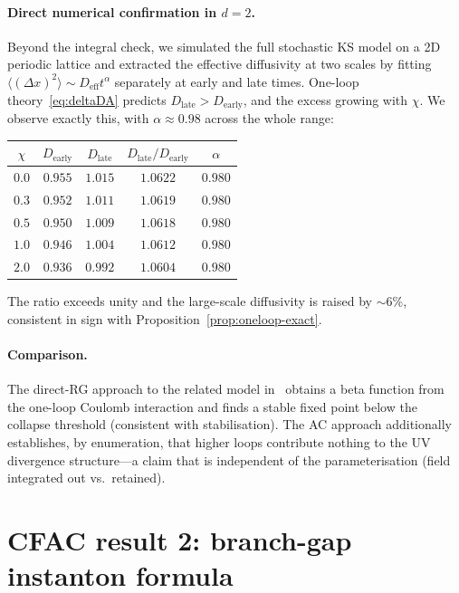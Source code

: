 \documentclass[11pt,a4paper]{article}
\theoremstyle{plain}
\begin{document}
\paragraph{Direct numerical confirmation in $d=2$.}
Beyond the integral check, we simulated the full stochastic KS
model on a 2D periodic lattice and extracted the effective
diffusivity at two scales by fitting
$\langle(\Delta x)^2\rangle \sim D_{\mathrm{eff}} t^\alpha$
separately at early and late times.  One-loop
theory~\eqref{eq:deltaDA} predicts $D_{\mathrm{late}} >
D_{\mathrm{early}}$, and the excess growing with
$\chi$.  We observe exactly this, with $\alpha \approx 0.98$
across the whole range:
\begin{center}\small
\begin{tabular}{@{}ccccc@{}}\toprule
$\chi$ & $D_{\mathrm{early}}$ & $D_{\mathrm{late}}$ &
$D_{\mathrm{late}}/D_{\mathrm{early}}$ & $\alpha$ \\ \midrule
$0.0$ & $0.955$ & $1.015$ & $1.0622$ & $0.980$ \\
$0.3$ & $0.952$ & $1.011$ & $1.0619$ & $0.980$ \\
$0.5$ & $0.950$ & $1.009$ & $1.0618$ & $0.980$ \\
$1.0$ & $0.946$ & $1.004$ & $1.0612$ & $0.980$ \\
$2.0$ & $0.936$ & $0.992$ & $1.0604$ & $0.980$ \\
\bottomrule\end{tabular}
\end{center}
The ratio exceeds unity and the large-scale diffusivity is
raised by $\sim 6$\%, consistent in sign with
Proposition~\ref{prop:oneloop-exact}.

\paragraph{Comparison.}
The direct-RG approach to the related model
in~\cite{GelimsonGolestanian2015} obtains a beta function from
the one-loop Coulomb interaction and finds a stable fixed point
below the collapse threshold (consistent with stabilisation).
The AC approach additionally establishes, by enumeration, that
higher loops contribute nothing to the UV divergence
structure---a claim that is independent of the parameterisation
(field integrated out vs.\ retained).

\section{CFAC result 2: branch-gap instanton formula}
\label{sec:branch-gap}
\end{document}
